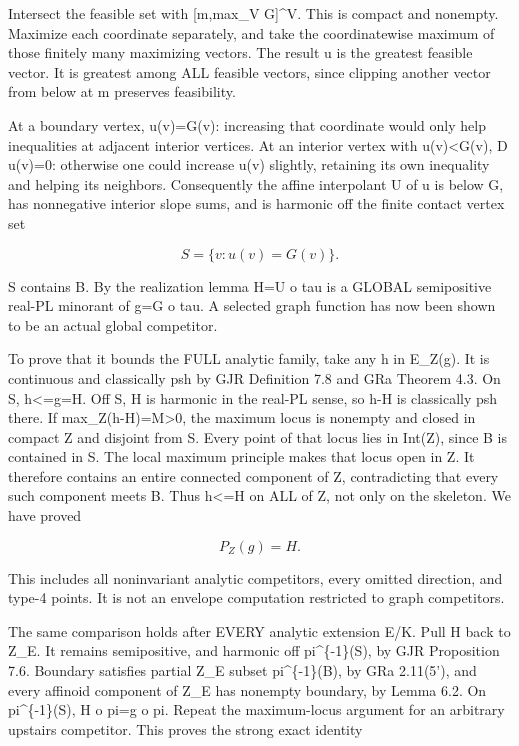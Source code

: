 \documentclass[11pt]{article}
\begin{document}
Intersect the feasible set with [m,max\_V G]\textasciicircum{}V. This is compact and nonempty. Maximize each coordinate separately, and take the coordinatewise maximum of those finitely many maximizing vectors. The result u is the greatest feasible vector. It is greatest among ALL feasible vectors, since clipping another vector from below at m preserves feasibility.

At a boundary vertex, u(v)=G(v): increasing that coordinate would only help inequalities at adjacent interior vertices. At an interior vertex with u(v)<G(v), D u(v)=0: otherwise one could increase u(v) slightly, retaining its own inequality and helping its neighbors. Consequently the affine interpolant U of u is below G, has nonnegative interior slope sums, and is harmonic off the finite contact vertex set

\[
S=\{v:u(v)=G(v)\}.
\]

S contains B. By the realization lemma H=U o tau is a GLOBAL semipositive real-PL minorant of g=G o tau. A selected graph function has now been shown to be an actual global competitor.

To prove that it bounds the FULL analytic family, take any h in E\_Z(g). It is continuous and classically psh by GJR Definition 7.8 and GRa Theorem 4.3. On S, h<=g=H. Off S, H is harmonic in the real-PL sense, so h-H is classically psh there. If max\_Z(h-H)=M>0, the maximum locus is nonempty and closed in compact Z and disjoint from S. Every point of that locus lies in Int(Z), since B is contained in S. The local maximum principle makes that locus open in Z. It therefore contains an entire connected component of Z, contradicting that every such component meets B. Thus h<=H on ALL of Z, not only on the skeleton. We have proved

\[
P_Z(g)=H.
\]

This includes all noninvariant analytic competitors, every omitted direction, and type-4 points. It is not an envelope computation restricted to graph competitors.

The same comparison holds after EVERY analytic extension E/K. Pull H back to Z\_E. It remains semipositive, and harmonic off pi\textasciicircum{}\{-1\}(S), by GJR Proposition 7.6. Boundary satisfies partial Z\_E subset pi\textasciicircum{}\{-1\}(B), by GRa 2.11(5'), and every affinoid component of Z\_E has nonempty boundary, by Lemma 6.2. On pi\textasciicircum{}\{-1\}(S), H o pi=g o pi. Repeat the maximum-locus argument for an arbitrary upstairs competitor. This proves the strong exact identity
\end{document}
